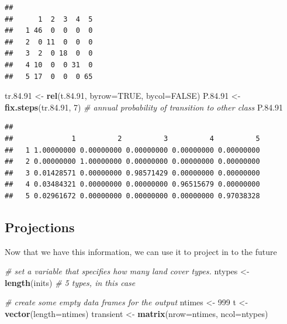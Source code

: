 \documentclass[
]{article}
\newenvironment{Shaded}{\begin{snugshade}}{\end{snugshade}}
\newcommand{\AttributeTok}[1]{\textcolor[rgb]{0.13,0.29,0.53}{#1}}
\newcommand{\CommentTok}[1]{\textcolor[rgb]{0.56,0.35,0.01}{\textit{#1}}}
\newcommand{\ConstantTok}[1]{\textcolor[rgb]{0.56,0.35,0.01}{#1}}
\newcommand{\DecValTok}[1]{\textcolor[rgb]{0.00,0.00,0.81}{#1}}
\newcommand{\FloatTok}[1]{\textcolor[rgb]{0.00,0.00,0.81}{#1}}
\newcommand{\FunctionTok}[1]{\textcolor[rgb]{0.13,0.29,0.53}{\textbf{#1}}}
\newcommand{\NormalTok}[1]{#1}
\newcommand{\OtherTok}[1]{\textcolor[rgb]{0.56,0.35,0.01}{#1}}
\begin{document}
\begin{verbatim}
##    
##      1  2  3  4  5
##   1 46  0  0  0  0
##   2  0 11  0  0  0
##   3  2  0 18  0  0
##   4 10  0  0 31  0
##   5 17  0  0  0 65
\end{verbatim}

\begin{Shaded}
\begin{Highlighting}[]
\NormalTok{tr.}\FloatTok{84.91} \OtherTok{\textless{}{-}} \FunctionTok{rel}\NormalTok{(t.}\FloatTok{84.91}\NormalTok{, }\AttributeTok{byrow=}\ConstantTok{TRUE}\NormalTok{, }\AttributeTok{bycol=}\ConstantTok{FALSE}\NormalTok{)}
\NormalTok{P.}\FloatTok{84.91} \OtherTok{\textless{}{-}} \FunctionTok{fix.steps}\NormalTok{(tr.}\FloatTok{84.91}\NormalTok{, }\DecValTok{7}\NormalTok{)}
  \CommentTok{\# annual probability of transition to other class}
\NormalTok{P.}\FloatTok{84.91}
\end{Highlighting}
\end{Shaded}

\begin{verbatim}
##    
##              1          2          3          4          5
##   1 1.00000000 0.00000000 0.00000000 0.00000000 0.00000000
##   2 0.00000000 1.00000000 0.00000000 0.00000000 0.00000000
##   3 0.01428571 0.00000000 0.98571429 0.00000000 0.00000000
##   4 0.03484321 0.00000000 0.00000000 0.96515679 0.00000000
##   5 0.02961672 0.00000000 0.00000000 0.00000000 0.97038328
\end{verbatim}

\subsection{Projections}\label{projections}

Now that we have this information, we can use it to project in to the
future

\begin{Shaded}
\begin{Highlighting}[]
  \CommentTok{\# set a variable that specifies how many land cover types.}
\NormalTok{ntypes }\OtherTok{\textless{}{-}} \FunctionTok{length}\NormalTok{(inits) }\CommentTok{\# 5 types, in this case}

\CommentTok{\# create some empty data frames for the output }
\NormalTok{ntimes }\OtherTok{\textless{}{-}} \DecValTok{999}        
\NormalTok{t }\OtherTok{\textless{}{-}} \FunctionTok{vector}\NormalTok{(}\AttributeTok{length=}\NormalTok{ntimes)}
\NormalTok{transient }\OtherTok{\textless{}{-}} \FunctionTok{matrix}\NormalTok{(}\AttributeTok{nrow=}\NormalTok{ntimes, }\AttributeTok{ncol=}\NormalTok{ntypes)}
\end{Highlighting}
\end{Shaded}
\end{document}

